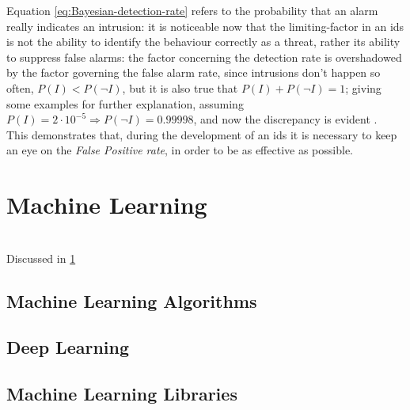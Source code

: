 Equation \ref{eq:Bayesian-detection-rate} refers to the probability that an alarm really indicates an intrusion: it is noticeable now that the limiting-factor in an \gls{ids} is not the ability to identify the behaviour correctly as a threat, rather its ability to suppress false alarms: the factor concerning the detection rate is overshadowed by the factor governing the false alarm rate, since intrusions don't happen so often, $P(I)<P(\neg I)$, but it is also true that $P(I)+P(\neg I)=1$; giving some examples for further explanation, assuming $P(I)=2\cdot 10^{-5}\Rightarrow P(\neg I)=0.99998$, and now the discrepancy is evident \cite{Axelsson2000}. \\ This demonstrates that, during the development of an \gls{ids} it is necessary to keep an eye on the \textit{False Positive rate}, in order to be as effective as possible.


\section{Machine Learning}
\label{sec:machine-learning}


\lipsum[1-4] \\
Discussed in \ref{sec:machine-learning}


\subsection{Machine Learning Algorithms}
\label{subsec:ml-algorithms}

\lipsum[1-6]


\subsection{Deep Learning}
\label{subsec:deep-learning}

\lipsum[1-3]


\subsection{Machine Learning Libraries}
\label{subsec:ml-libraries}

\lipsum[1]